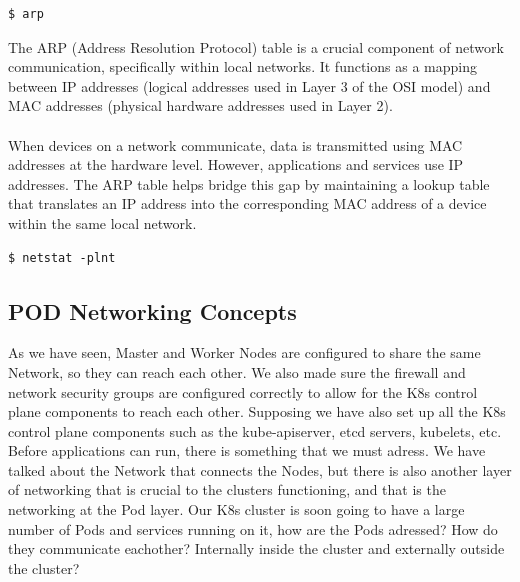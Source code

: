 \documentclass{article}
\newenvironment{blocktemplateII}[1]{%
    \tcolorbox[beamer,%
    noparskip,breakable,
    colframe=Green,%
    colbacklower=LimeGreen!75!LightGreen,%
    title=#1]}%
    {\endtcolorbox}
\newenvironment{codetemplate}[1][]{%
  \mybasecolorbox[#1]
  \itshape
}{%
  \endmybasecolorbox
}
\begin{document}
\begin{codetemplate}{}
\begin{verbatim}
$ arp
\end{verbatim}
\end{codetemplate}

\begin{blocktemplateII}{NOTE}
The ARP (Address Resolution Protocol) table is a crucial component of network communication, specifically within local networks. It functions as a mapping between IP addresses (logical addresses used in Layer 3 of the OSI model) and MAC addresses (physical hardware addresses used in Layer 2).
\\\\
When devices on a network communicate, data is transmitted using MAC addresses at the hardware level. However, applications and services use IP addresses. The ARP table helps bridge this gap by maintaining a lookup table that translates an IP address into the corresponding MAC address of a device within the same local network.
\end{blocktemplateII}

\begin{codetemplate}{}
\begin{verbatim}
$ netstat -plnt
\end{verbatim}
\end{codetemplate}

\subsection{POD Networking Concepts}

As we have seen, Master and Worker Nodes are configured to share the same Network, so they can reach each other. We also made sure the firewall and network security groups are configured correctly to allow for the K8s control plane components to reach each other. Supposing we have also set up all the K8s control plane components such as the kube-apiserver, etcd servers, kubelets, etc. Before applications can run, there is something that we must adress. We have talked about the Network that connects the Nodes,  but there is also another layer of networking that is crucial to the clusters functioning, and that is the networking at the Pod layer. Our K8s cluster is soon going to have a large number of Pods and services running on it, how are the Pods adressed? How do they communicate eachother? Internally inside the cluster and externally outside the cluster?
\end{document}
